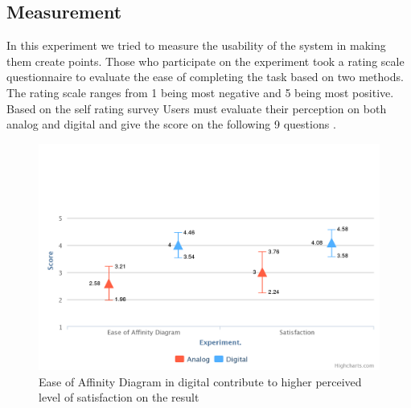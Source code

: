 \documentclass{sigchi}
\begin{document}
\begin{itemize}
\begin{itemize}
\section{Measurement}
In this experiment we tried to measure the usability of the system in making them create points. 
Those who participate on the experiment  took a rating scale questionnaire to evaluate the ease of completing the task based on two methods. The rating scale ranges  from 1 being most negative and 5 being most positive.  Based on the self rating survey Users must evaluate their perception on both analog and digital and give the score on the following 9 questions . 



\begin{figure}[!h]
\centering
\includegraphics[width=1.1\columnwidth]{affinity}
\caption{Ease of Affinity Diagram in digital contribute to higher perceived level of satisfaction on the result}
\label{fig:figure1}
\end{figure}




\end{itemize}
\end{itemize}
\end{document}

